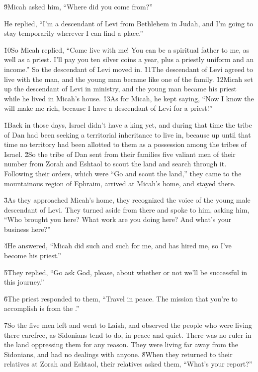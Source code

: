 \v{9}Micah asked him, ``Where did you come from?''

He replied, ``I'm a descendant of Levi from Bethlehem in Judah, and I'm going to stay temporarily wherever I can find a place.''

\v{10}So Micah replied, ``Come live with me! You can be a spiritual father to me, as well as a priest. I'll pay you ten silver coins a year, plus a priestly uniform and an income.'' So the descendant of Levi moved in. \v{11}The descendant of Levi agreed to live with the man, and the young man became like one of the family. \v{12}Micah set up the descendant of Levi in ministry, and the young man became his priest while he lived in Micah's house. \v{13}As for Micah, he kept saying, ``Now I know the  will make me rich, because I have a descendant of Levi for a priest!''

\v{1}Back in those days, Israel didn't have a king yet, and during that time the tribe of Dan had been seeking a territorial inheritance to live in, because up until that time no territory had been allotted to them as a possession among the tribes of Israel. \v{2}So the tribe of Dan sent from their families five valiant men of their number from Zorah and Eshtaol to scout the land and search through it. Following their orders, which were ``Go and scout the land,'' they came to the mountainous region of Ephraim, arrived at Micah's home, and stayed there.

\v{3}As they approached Micah's home, they recognized the voice of the young male descendant of Levi. They turned aside from there and spoke to him, asking him, ``Who brought you here? What work are you doing here? And what's your business here?''

\v{4}He answered, ``Micah did such and such for me, and has hired me, so I've become his priest.''

\v{5}They replied, ``Go ask God, please, about whether or not we'll be successful in this journey.''

\v{6}The priest responded to them, ``Travel in peace. The mission that you're to accomplish is from the .''

\v{7}So the five men left and went to Laish, and observed the people who were living there carefree, as Sidonians tend to do, in peace and quiet. There was no ruler in the land oppressing them for any reason. They were living far away from the Sidonians, and had no dealings with anyone. \v{8}When they returned to their relatives at Zorah and Eshtaol, their relatives asked them, ``What's your report?''

